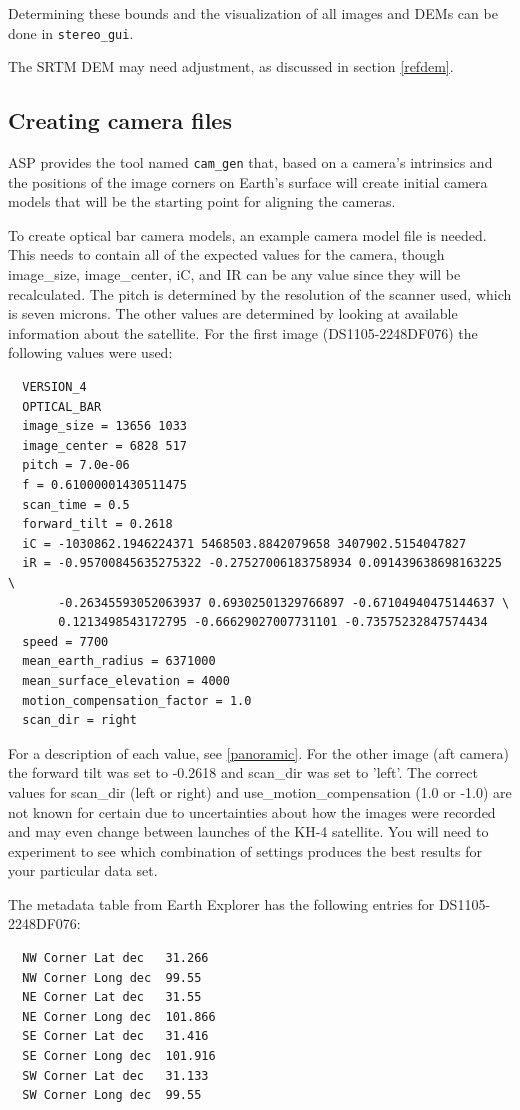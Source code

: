 Determining these bounds and the visualization of all images and DEMs
can be done in \texttt{stereo\_gui}.

The SRTM DEM may need adjustment, as discussed in section \ref{refdem}.

\subsection{Creating camera files}

ASP provides the tool named \texttt{cam\_gen} that, based on a camera's intrinsics
and the positions of the image corners on Earth's surface will
create initial camera models that will be the starting point for aligning the cameras.

To create optical bar camera models, an example camera model file is needed.
This needs to contain all of the expected values for the camera, though
image\_size, image\_center, iC, and IR can be any value since they will be recalculated.
The pitch is determined by the resolution of the scanner used, which is seven microns.
The other values are determined by looking at available information about the satellite.
For the first image (DS1105-2248DF076) the following values were used:

\begin{verbatim}
  VERSION_4
  OPTICAL_BAR
  image_size = 13656 1033
  image_center = 6828 517
  pitch = 7.0e-06
  f = 0.61000001430511475
  scan_time = 0.5
  forward_tilt = 0.2618
  iC = -1030862.1946224371 5468503.8842079658 3407902.5154047827
  iR = -0.95700845635275322 -0.27527006183758934 0.091439638698163225 \
       -0.26345593052063937 0.69302501329766897 -0.67104940475144637 \
       0.1213498543172795 -0.66629027007731101 -0.73575232847574434
  speed = 7700
  mean_earth_radius = 6371000
  mean_surface_elevation = 4000
  motion_compensation_factor = 1.0
  scan_dir = right
\end{verbatim}

For a description of each value, see \ref{panoramic}.
For the other image (aft camera) the forward tilt was set to -0.2618 and scan\_dir was set to 'left'.
The correct values for scan\_dir (left or right) and use\_motion\_compensation (1.0 or -1.0) are not
known for certain due to uncertainties about how the images were recorded and may even change
between launches of the KH-4 satellite.  You will need to experiment to see which combination of settings
produces the best results for your particular data set.

The metadata table from Earth Explorer has the following entries
for DS1105-2248DF076:
\begin{verbatim}
  NW Corner Lat dec   31.266
  NW Corner Long dec  99.55
  NE Corner Lat dec   31.55
  NE Corner Long dec  101.866
  SE Corner Lat dec   31.416
  SE Corner Long dec  101.916
  SW Corner Lat dec   31.133
  SW Corner Long dec  99.55
\end{verbatim}


